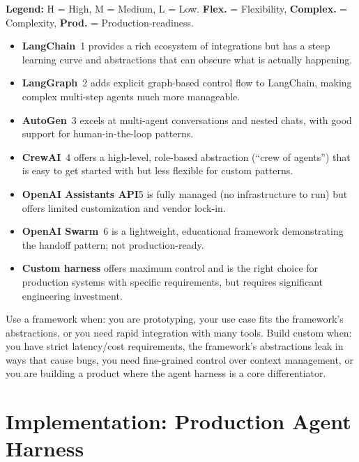 \textbf{Legend:} H = High, M = Medium, L = Low. \textbf{Flex.} = Flexibility, \textbf{Complex.} = Complexity, \textbf{Prod.} = Production-readiness.

\begin{itemize}
  \item \textbf{LangChain}~\cite{chase2022langchain}1 provides a rich ecosystem of integrations but has a steep learning curve and abstractions that can obscure what is actually happening.
  \item \textbf{LangGraph}~\cite{langchain2024langgraph}2 adds explicit graph-based control flow to LangChain, making complex multi-step agents much more manageable.
  \item \textbf{AutoGen}~\cite{wu2023autogen}3 excels at multi-agent conversations and nested chats, with good support for human-in-the-loop patterns.
  \item \textbf{CrewAI}~\cite{moura2023crewai}4 offers a high-level, role-based abstraction (``crew of agents'') that is easy to get started with but less flexible for custom patterns.
  \item \textbf{OpenAI Assistants API}5 is fully managed (no infrastructure to run) but offers limited customization and vendor lock-in.
  \item \textbf{OpenAI Swarm}~\cite{openai2024swarm}6 is a lightweight, educational framework demonstrating the handoff pattern; not production-ready.
  \item \textbf{Custom harness} offers maximum control and is the right choice for production systems with specific requirements, but requires significant engineering investment.
\end{itemize}

\begin{questionbox}
Use a framework when: you are prototyping, your use case fits the framework’s abstractions, or you need rapid integration with many tools. Build custom when: you have strict latency/cost requirements, the framework’s abstractions leak in ways that cause bugs, you need fine-grained control over context management, or you are building a product where the agent harness is a core differentiator.
\end{questionbox}

\section{Implementation: Production Agent Harness}
\label{subsec:implementation}

